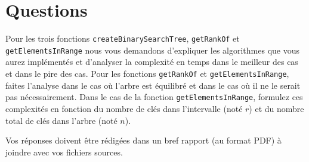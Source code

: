 \documentclass[a4paper,10pt]{article}
\begin{document}
\section{Questions}

Pour les trois fonctions \texttt{createBinarySearchTree},
\texttt{getRankOf} et \texttt{getElementsInRange} nous vous demandons
d'expliquer les algorithmes que vous aurez implémentés et d'analyser
la complexité en temps dans le meilleur des cas et dans le pire des
cas. Pour les fonctions \texttt{getRankOf} et
\texttt{getElementsInRange}, faites l'analyse dans le cas où l'arbre
est équilibré et dans le cas où il ne le serait pas
nécessairement. Dans le cas de la fonction
\texttt{getElementsInRange}, formulez ces complexités en fonction du
nombre de clés dans l'intervalle (noté $r$) et du nombre total de clés
dans l'arbre (noté $n$).

Vos réponses doivent être rédigées dans un bref rapport (au format
PDF) à joindre avec vos fichiers sources.
\end{document}

